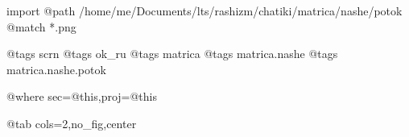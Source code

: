 
 
 
 
 

\ifcmt
  import
    @path /home/me/Documents/lts/rashizm/chatiki/matrica/nashe/potok
    @match *.png

    @tags scrn
    @tags ok_ru
    @tags matrica
    @tags matrica.nashe
    @tags matrica.nashe.potok

    @where sec=@this,proj=@this
  
    @tab cols=2,no_fig,center
\fi
